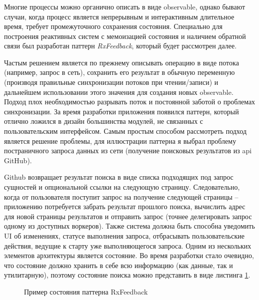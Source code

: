 \subsubsection{}
\label{sec:development:arch:ios:rxfeedback}

Многие процессы можно органично описать в виде \gls{observable}, однако бывают случаи, когда процесс является непрерывным и интерактивным длительное время, требует промежуточного сохранения состояния. Специально для построения реактивных систем с мемоизацией состояния и наличием обратной связи был разработан паттерн \emph{RxFeedback}, который будет рассмотрен далее.

Частым решением является по прежнему описывать операцию в виде потока (например, запрос в сеть), сохранить его результат в обычную переменную (производя правильные синхронизации потоков при чтении/записи) и дальнейшем использовании этого значения для создания новых \gls{observable}. Подход плох необходимостью разрывать поток и постоянной заботой о проблемах синхронизации. За время разработки приложения появился паттерн, который отлично ложился в дизайн большинства модулей, не связанных с пользовательским интерфейсом.
Самым простым способом рассмотреть подход является решение проблемы, для иллюстрации паттерна я выбрал проблему постраничного запроса данных из сети (получение поисковых результатов из \gls{api} GitHub).

Github возвращает результат поиска в виде списка подходящих под запрос сущностей и опциональной ссылки на следующую страницу. Следовательно, когда от пользователя поступит запрос на получение следующей страницы -- приложению потребуется забрать результат прошлого поиска, вычислить адрес для новой страницы результатов и отправить запрос (точнее делегировать запрос одному из доступных воркеров). Также система должна быть способна уведомить UI об изменениях, статусе выполнения запроса, отбрасывать пользовательские действия, ведущие к старту уже выполняющегося запроса.
Одним из нескольких элементов архитектуры является состояние. Во время разработки стало очевидно, что состояние должно хранить в себе всю информацию (как данные, так и утилитарную), поэтому состояние поиска можно представить в виде листинга \ref{sec:development:arch:ios:rxfeedback:example:state}.

\begin{figure}[h]
  
   \caption{Пример состояния паттерна RxFeedback}
   \label{sec:development:arch:ios:rxfeedback:example:state}
\end{figure}

